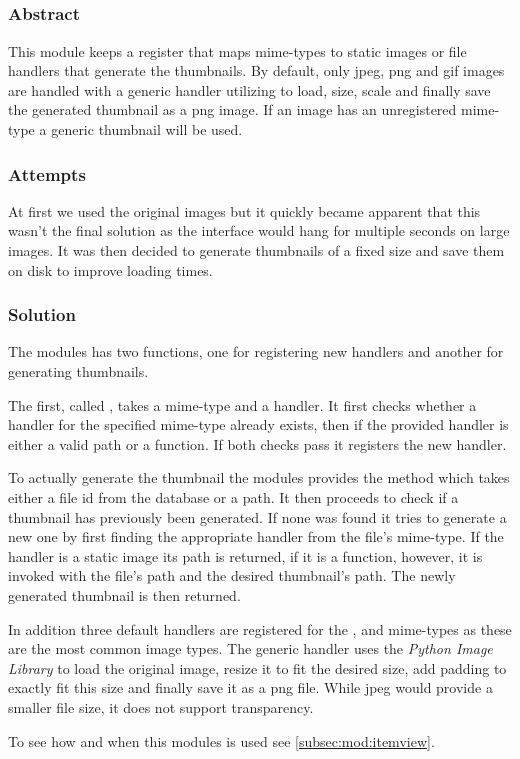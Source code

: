 \subsection{}
\label{sub:mod:thumbnail}
\def\kapitelautor{Clemens Stadlbauer}

\subsubsection{Abstract}

This module keeps a register that maps mime-types to static images or file
handlers that generate the thumbnails. By default, only jpeg, png and gif
images are handled with a generic handler utilizing  to
load, size, scale and finally save the generated thumbnail as a png image. If
an image has an unregistered mime-type a generic thumbnail will be used.

\subsubsection{Attempts}

At first we used the original images but it quickly became apparent that this
wasn't the final solution as the interface would hang for multiple seconds on
large images. It was then decided to generate thumbnails of a fixed size and
save them on disk to improve loading times.

\subsubsection{Solution} %

The modules has two functions, one for registering new handlers and another for
generating thumbnails.

The first, called , takes a mime-type and a handler. It first
checks whether a handler for the specified mime-type already exists, then if
the provided handler is either a valid path or a function. If both checks pass
it registers the new handler.

To actually generate the thumbnail the modules provides the
 method which takes either a file id from the database or
a path. It then proceeds to check if a thumbnail has previously been generated.
If none was found it tries to generate a new one by first finding the
appropriate handler from the file's mime-type. If the handler is a static image
its path is returned, if it is a function, however, it is invoked with the
file's path and the desired thumbnail's path. The newly generated thumbnail is
then returned.

In addition three default handlers are registered for the ,
 and  mime-types as these are the most
common image types. The generic handler uses the \emph{Python Image
Library} to load the original image, resize it to fit the desired
size, add padding to exactly fit this size and finally save it as a png file.
While jpeg would provide a smaller file size, it does not support transparency.

To see how and when this modules is used see \cref{subsec:mod:itemview}.
